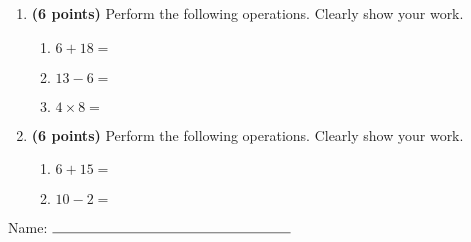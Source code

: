 \documentclass[12pt]{amsart}
\begin{document}
\newpage
\begin{enumerate}
\item {\bf (6 points)} 
 Perform the following operations. Clearly show your work. \begin{enumerate}


\def \a{6}\def \b{18}\def \apb{24}

 
\item $\a + \b = $

\vspace{2cm}
\def \a{13}\def \dif{7}\def \b{6}

 
\item $\a - \b = $

\vspace{2cm}
\def \a{4}\def \b{8}\def \ab{12}

 
\item $\a \times \b = $ 

\vspace{2cm}
\def \vshift{-3}\def \hshift{2}\def \chang{2}\def \findval{4}\def \yval{-7}

 
\end{enumerate}


\newpage
\item {\bf (6 points)} 
 Perform the following operations. Clearly show your work. \begin{enumerate}


\def \a{6}\def \b{15}\def \apb{21}

 
\item $\a + \b = $

\vspace{2cm}
\def \a{10}\def \dif{8}\def \b{2}

 
\item $\a - \b = $

\vspace{2cm}
\def \vshift{-3}\def \hshift{-4}\def \chang{-2}\def \findval{-6}\def \yval{1}

 
\end{enumerate}


\newpage\end{enumerate}\graphicspath{{/Users/jilan/Downloads/Randomizer/Randomizer/Sample Course/Sample Assessment 2/}}\setcounter{page}{1}


\thispagestyle{fancy}

 
\noindent Name: $\rule{6cm}{0.15mm}$

\vspace{.2cm}
\end{document}
